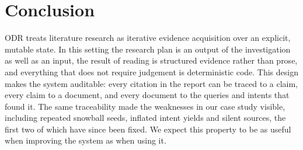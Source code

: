 \documentclass{article}
\newcommand{\sys}{ODR}
\begin{document}
\section{Conclusion}

\sys{} treats literature research as iterative evidence acquisition over an
explicit, mutable state. In this setting the research plan is an output of
the investigation as well as an input, the result of reading is structured
evidence rather than prose, and everything that does not require judgement
is deterministic code. This design makes the system auditable: every
citation in the report can be traced to a claim, every claim to a document, and
every document to the queries and intents that found it. The same
traceability made the weaknesses in our case study visible, including
repeated snowball seeds, inflated intent yields and silent sources, the
first two of which have since been fixed. We
expect this property to be as useful when improving the system as when
using it.



\end{document}
